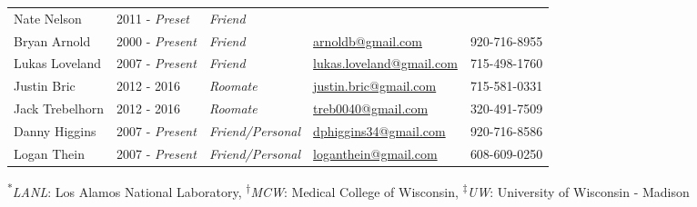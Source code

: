\begin{center}
\begin{minipage}{\textwidth}
\begin{tabular}{p{3.2cm}p{2.2cm}p{3.7cm}p{5.0cm}p{2.4cm}}

	Nate Nelson & 2011 - \emph{Preset} & \textit{Friend} & & \\

Bryan Arnold & 2000 - \emph{Present} & \textit{Friend} &  \href{mailto:arnoldb@gmail.com}{arnoldb@gmail.com} &   920-716-8955 \\
Lukas Loveland & 2007 - \emph{Present} & \textit{Friend} &  \href{mailto:lukas.loveland@gmail.com}{lukas.loveland@gmail.com} &   715-498-1760\\ 
Justin Bric & 2012 - 2016& \textit{Roomate} & \href{mailto:justin.bric@gmail.com}{justin.bric@gmail.com} &  715-581-0331 \\ 
Jack Trebelhorn & 2012 - 2016 & \textit{Roomate} & \href{mailto:treb0040@gmail.com}{treb0040@gmail.com} &   320-491-7509 \\
Danny Higgins & 2007 - \emph{Present} & \textit{Friend/Personal} & \href{mailto:dphiggins34@gmail.com}{dphiggins34@gmail.com} & 920-716-8586 \\
Logan Thein & 2007 - \emph{Present} & \textit{Friend/Personal} & \href{mailto:loganthein@gmail.com}{loganthein@gmail.com}  &   608-609-0250  \\

\end{tabular}
\end{minipage}
\end{center}

\begin{center}
\begin{minipage}{\textwidth}
\footnotesize
\centering
\textsuperscript{*}\textit{LANL}: Los Alamos National Laboratory, \textsuperscript{$\dagger$}\textit{MCW}: Medical College of Wisconsin, \textsuperscript{$\ddagger$}\textit{UW}: University of Wisconsin - Madison \\
\end{minipage}
\end{center}

